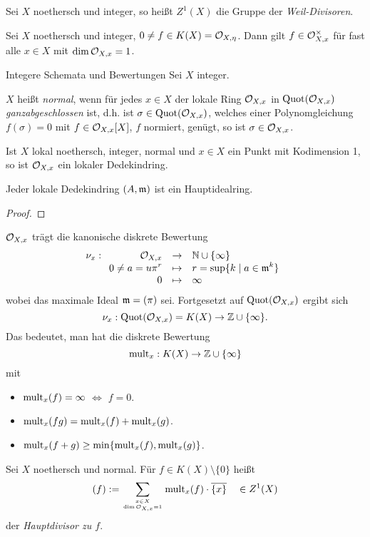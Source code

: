 \begin{definition}
    Sei $X$ noethersch und integer, so heißt $Z^1(X)$ die Gruppe der
    \emph{Weil-Divisoren}.
\end{definition}

\begin{satz}
    Sei $X$ noethersch und integer, $0\neq f \in K(X) = \mathcal{O}_{X,\eta}$.
    Dann gilt $f \in \mathcal{O}_{X,x}^\times$ für fast alle $x\in X$ mit
    $\dim \mathcal{O}_{X,x} = 1$.
\end{satz}


\begin{einschub}{Integere Schemata und Bewertungen}
Sei $X$ integer.

\begin{definition}
    $X$ heißt \emph{normal}, wenn für jedes $x \in X$ der lokale Ring
    $\mathcal{O}_{X,x}$ in $\operatorname{Quot}(\mathcal{O}_{X,x})$ \emph{ganzabgeschlossen} ist,
    d.h. ist $\sigma \in \operatorname{Quot}(\mathcal{O}_{X,x})$, welches einer Polynomgleichung
    $f(\sigma) = 0$ mit $f \in \mathcal{O}_{X,x}[X]$, $f$ normiert, genügt,
    so ist $\sigma \in \mathcal{O}_{X,x}$.
\end{definition}

\begin{bemerkung}
    Ist $X$ lokal noethersch, integer, normal und $x \in X$ ein Punkt mit
    Kodimension 1, so ist $\mathcal{O}_{X,x}$ ein lokaler Dedekindring.
\end{bemerkung}

\begin{lemma}
    Jeder lokale Dedekindring $(A,\mathfrak{m})$ ist ein Hauptidealring. 
\end{lemma}
\begin{proof}
\TODO
\end{proof}

\begin{folgerung}
    $\mathcal{O}_{X,x}$ trägt die kanonische diskrete Bewertung
    \[ \nu_x: \funcdef{ \O_{X,x} & \to & \N \cup\{\infty\} \\
        0\neq a = u \pi^r & \mapsto & r = \sup\{k \mid a \in \m^k\}\\
        0 & \mapsto & \infty  }\]
    wobei das maximale Ideal $\mathfrak{m} = (\pi)$ sei. Fortgesetzt auf
    $\operatorname{Quot}(\mathcal{O}_{X,x})$ ergibt sich
    \[\nu_x: \operatorname{Quot}(\mathcal{O}_{X,x}) = K(X) \to \mathbb{Z}\cup \{\infty\}.\]
    Das bedeutet, man hat die diskrete Bewertung
    \[\operatorname{mult}_x: K(X) \to \mathbb{Z}\cup\{\infty\}\]
    mit
    \begin{itemize}
      \item $\operatorname{mult}_x(f) = \infty$ $\Leftrightarrow$ $f=0$.
      \item $\operatorname{mult}_x(fg) = \operatorname{mult}_x(f) + \operatorname{mult}_x(g)$.
      \item $\operatorname{mult}_x(f+g) \geq \min\{\operatorname{mult}_x(f), \operatorname{mult}_x(g)\}$.
    \end{itemize}
\end{folgerung}
\end{einschub}

\begin{definition}[Hauptdivisor]
    Sei $X$ noethersch und normal. Für $f \in K(X)\setminus\{0\}$ heißt
    \[(f) := \sum_{x\in X\atop \dim\mathcal{O}_{X,x} = 1} \operatorname{mult}_x(f) \cdot \overline{\{x\}}
        \quad \in Z^1(X)\]
    der \emph{Hauptdivisor zu $f$}.
\end{definition}



\pagebreak



